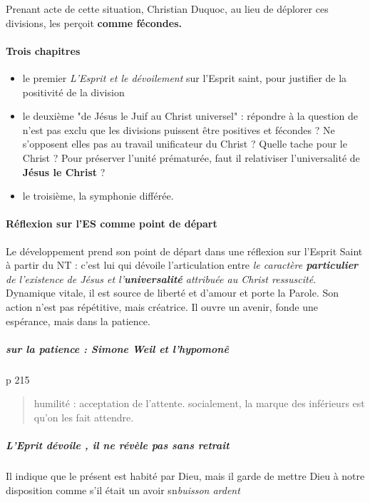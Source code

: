 Prenant acte de cette situation, Christian Duquoc, au lieu de déplorer ces divisions, les perçoit\textbf{ comme fécondes.  }
\paragraph{Trois chapitres} 
\begin{itemize}
    \item le premier\textit{ L'Esprit et le dévoilement} sur l'Esprit saint, pour justifier de la positivité de la division
    \item le deuxième "de Jésus le Juif au Christ universel" : répondre à la question de n'est pas exclu que les divisions puissent être positives et fécondes ? Ne s'opposent elles pas au travail unificateur du Christ ? Quelle tache pour le Christ ? Pour préserver l'unité prématurée, faut il relativiser l'universalité de \textbf{Jésus le Christ} ?
    \item le troisième, la symphonie différée. 
\end{itemize}


  





\paragraph{Réflexion sur l'ES comme point de départ}  
 Le développement prend son point de départ dans une réflexion sur l’Esprit Saint à partir du NT : c’est lui qui dévoile l’articulation entre \textit{le caractère \textbf{particulier} de l’existence de Jésus et l’\textbf{universalité} attribuée au Christ ressuscité}. Dynamique vitale, il est source de liberté et d’amour et porte la Parole. Son action n’est pas répétitive, mais créatrice. Il ouvre un avenir, fonde une espérance, mais dans la patience.



\subparagraph{sur la patience : Simone Weil et l'hypomonê} p 215 \begin{quote}
    humilité : acceptation de l'attente. socialement, la marque des inférieurs est qu'on les fait attendre. 
\end{quote}

\subparagraph{L'Eprit dévoile , il ne révèle pas sans retrait} Il indique que le présent est habité par Dieu, mais il garde de mettre Dieu à notre disposition comme s'il était un avoir sn{\textit{buisson ardent}}



